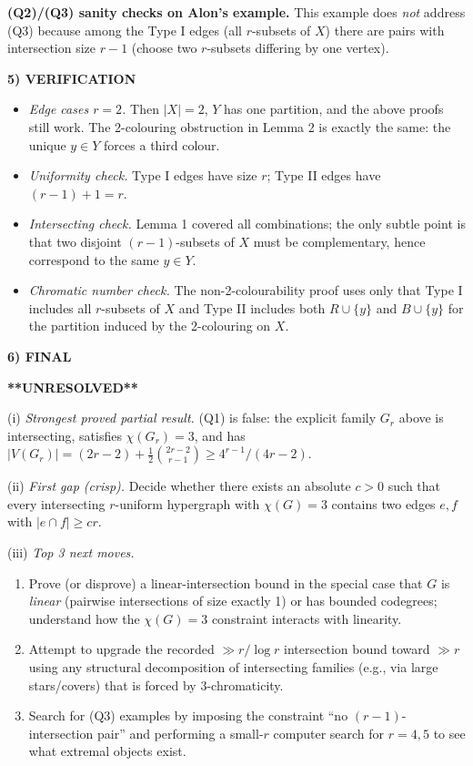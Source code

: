 \medskip
\noindent\textbf{(Q2)/(Q3) sanity checks on Alon's example.}
This example does \emph{not} address (Q3) because among the Type I edges (all $r$-subsets of $X$) there are pairs with intersection size $r-1$ (choose two $r$-subsets differing by one vertex).

\medskip
\noindent\textbf{5) VERIFICATION}

\begin{itemize}
\item \emph{Edge cases $r=2$.} Then $|X|=2$, $Y$ has one partition, and the above proofs still work. The 2-colouring obstruction in Lemma 2 is exactly the same: the unique $y\in Y$ forces a third colour.
\item \emph{Uniformity check.} Type I edges have size $r$; Type II edges have $(r-1)+1=r$.
\item \emph{Intersecting check.} Lemma 1 covered all combinations; the only subtle point is that two disjoint $(r-1)$-subsets of $X$ must be complementary, hence correspond to the same $y\in Y$.
\item \emph{Chromatic number check.} The non-2-colourability proof uses only that Type I includes all $r$-subsets of $X$ and Type II includes both $R\cup\{y\}$ and $B\cup\{y\}$ for the partition induced by the 2-colouring on $X$.
\end{itemize}

\medskip
\noindent\textbf{6) FINAL}

\textbf{**UNRESOLVED**}

(i) \emph{Strongest proved partial result.} (Q1) is false: the explicit family $G_r$ above is intersecting, satisfies $\chi(G_r)=3$, and has $|V(G_r)|=(2r-2)+\frac12\binom{2r-2}{r-1}\ge 4^{r-1}/(4r-2)$.

(ii) \emph{First gap (crisp).} Decide whether there exists an absolute $c>0$ such that every intersecting $r$-uniform hypergraph with $\chi(G)=3$ contains two edges $e,f$ with $|e\cap f|\ge c r$.

(iii) \emph{Top 3 next moves.}
\begin{enumerate}
\item Prove (or disprove) a linear-intersection bound in the special case that $G$ is \emph{linear} (pairwise intersections of size exactly 1) or has bounded codegrees; understand how the $\chi(G)=3$ constraint interacts with linearity.
\item Attempt to upgrade the recorded $\gg r/\log r$ intersection bound toward $\gg r$ using any structural decomposition of intersecting families (e.g., via large stars/covers) that is forced by 3-chromaticity.
\item Search for (Q3) examples by imposing the constraint ``no $(r-1)$-intersection pair'' and performing a small-$r$ computer search for $r=4,5$ to see what extremal objects exist.
\end{enumerate}

